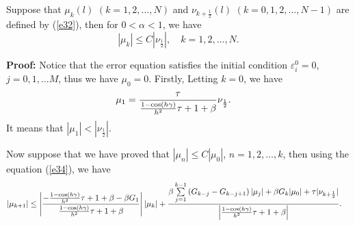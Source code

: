 \documentclass[3p,times]{elsarticle}
\begin{document}
\begin{lem}\label{le8}
Suppose that $\mu_k(l)$ $(k=1,2,\ldots,N)$ and $\nu_{k+\frac{1}{2}}(l)$ $(k=0,1,2,\ldots,N-1)$ are defined by (\ref{e32}), then for $0<\alpha<1$, we have
\begin{equation*}
|\mu_k|\leq C|\nu_{\frac{1}{2}}|,\quad k=1,2,\ldots,N.
\end{equation*}
\end{lem}
\textbf{Proof:} Notice that the error equation satisfies the initial condition $\varepsilon_i^0=0$, $j=0,1,\ldots M$, thus we have $\mu_0=0$.
Firstly, Letting $k=0$, we have
\begin{equation*}
\aligned
&\mu_{1}=\frac{\tau}{\frac{1-\cos(h\gamma)}{h^2}\tau+1+\beta}\nu_{\frac{1}{2}}.
\endaligned
\end{equation*}
It means that $|\mu_1|<|\nu_{\frac{1}{2}}|$.

Now suppose that we have proved that $|\mu_n|\leq C|\mu_0|$, $n=1,2,\ldots,k$, then using the equation (\ref{e34}), we have
\begin{equation}\label{e35}
\aligned
&|\mu_{k+1}|
\leq\left|\frac{-\frac{1-\cos(h\gamma)}{h^2}\tau+1+\beta-\beta G_1}{\frac{1-\cos(h\gamma)}{h^2}\tau+1+\beta}\right||\mu_k|+\frac{\beta\sum\limits_{j=1}^{k-1}\left(G_{k-j}-G_{k-j+1}\right)|\mu_j|+\beta G_k|\mu_0|+\tau|\nu_{k+\frac{1}{2}}|}{\left|\frac{1-\cos(h\gamma)}{h^2}\tau+1+\beta\right|}.
\endaligned
\end{equation}
\end{document}
